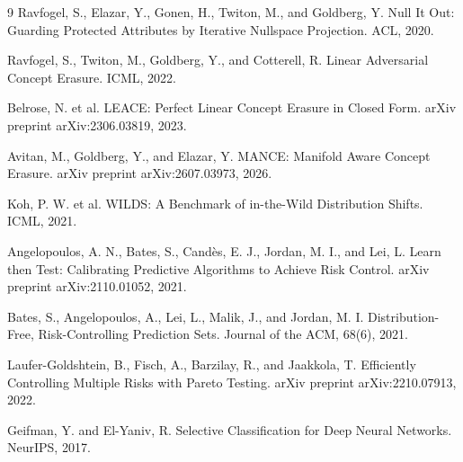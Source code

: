 \documentclass[10pt,twocolumn]{article}
\begin{document}
\begin{thebibliography}{9}
Ravfogel, S., Elazar, Y., Gonen, H., Twiton, M., and Goldberg, Y. Null It Out:
Guarding Protected Attributes by Iterative Nullspace Projection. ACL, 2020.

Ravfogel, S., Twiton, M., Goldberg, Y., and Cotterell, R. Linear Adversarial
Concept Erasure. ICML, 2022.

Belrose, N. et al. LEACE: Perfect Linear Concept Erasure in Closed Form. arXiv
preprint arXiv:2306.03819, 2023.

Avitan, M., Goldberg, Y., and Elazar, Y. MANCE: Manifold Aware Concept Erasure.
arXiv preprint arXiv:2607.03973, 2026.

Koh, P. W. et al. WILDS: A Benchmark of in-the-Wild Distribution Shifts. ICML,
2021.

Angelopoulos, A. N., Bates, S., Cand\`es, E. J., Jordan, M. I., and Lei, L.
Learn then Test: Calibrating Predictive Algorithms to Achieve Risk Control.
arXiv preprint arXiv:2110.01052, 2021.

Bates, S., Angelopoulos, A., Lei, L., Malik, J., and Jordan, M. I.
Distribution-Free, Risk-Controlling Prediction Sets. Journal of the ACM,
68(6), 2021.

Laufer-Goldshtein, B., Fisch, A., Barzilay, R., and Jaakkola, T. Efficiently
Controlling Multiple Risks with Pareto Testing. arXiv preprint
arXiv:2210.07913, 2022.

Geifman, Y. and El-Yaniv, R. Selective Classification for Deep Neural
Networks. NeurIPS, 2017.
\end{thebibliography}
\end{document}
